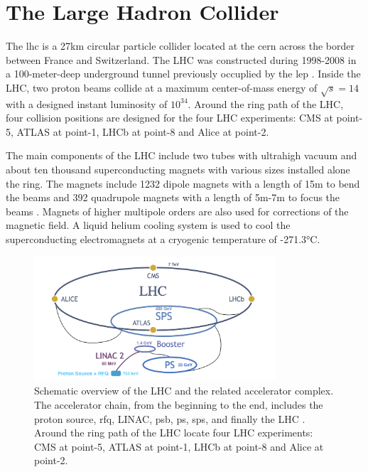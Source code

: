 
\section{The Large Hadron Collider}
\label{sec:cmsexperiment:lhc}

The \acrfull{lhc} \cite{exhep:lhc:Evans:2008zzb} is a 27km circular particle collider located at the \acrfull{cern} across the border between France and Switzerland. The LHC was constructed during 1998-2008 in a 100-meter-deep underground tunnel previously occuplied by the \acrfull{lep} \cite{exhep:lep:Myers:1991ym}. Inside the LHC, two proton beams collide at a maximum center-of-mass energy of $\sqrt{s}=14$\TeV with a designed instant luminosity of $10^{34}$\percms. Around the ring path of the LHC, four collision positions are designed for the four LHC experiments: CMS \cite{exhep:cms:Chatrchyan:2008aa} at point-5, ATLAS \cite{exhep:atlas:Aad:2008zzm} at point-1, LHCb \cite{exhep:lhcb:Alves:2008zz} at point-8 and Alice \cite{exhep:alice:Aamodt:2008zz} at point-2.


The main components of the LHC include two tubes with ultrahigh vacuum and about ten thousand superconducting magnets with various sizes installed alone the ring. The magnets include 1232 dipole magnets with a length of 15m to bend the beams and 392 quadrupole magnets with a length of 5m-7m to focus the beams \cite{exhep:lhcFactsFigures}. Magnets of higher multipole orders are also used for corrections of the magnetic field. A liquid helium cooling system is used to cool the superconducting electromagnets at a cryogenic temperature of -271.3\si{\degreeCelsius}. 


\begin{figure}[ht]
    \centering
    \includegraphics[width=0.8\textwidth]{chapters/CMSExperiment/sectionLHC/figures/lhc.png}
    \caption{Schematic overview of the LHC and the related accelerator complex. The accelerator chain, from the beginning to the end, includes the proton source, \acrfull{rfq}, LINAC, \acrfull{psb}, \acrfull{ps}, \acrfull{sps}, and finally the LHC \cite{exhep:lhcInject:Benedikt:2004wm}. Around the ring path of the LHC locate four LHC experiments: CMS \cite{exhep:cms:Chatrchyan:2008aa} at point-5, ATLAS \cite{exhep:atlas:Aad:2008zzm} at point-1, LHCb \cite{exhep:lhcb:Alves:2008zz} at point-8 and Alice \cite{exhep:alice:Aamodt:2008zz} at point-2.}
    \label{fig:cmsexperiment:lhc:map}
\end{figure}

